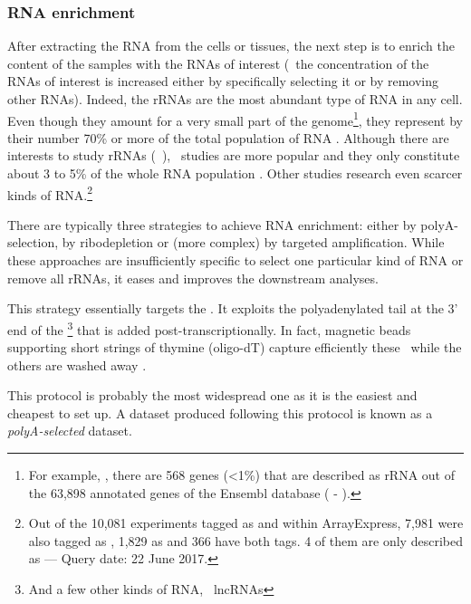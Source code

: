 \subsubsection{\gls{RNA} enrichment}

After extracting the \gls{RNA} from the cells or tissues,
the next step is to enrich the content of the samples with the \glspl{RNA}
of interest (\ie\ the concentration of the \glspl{RNA} of interest is increased
either by specifically selecting it or by removing other \glspl{RNA}). Indeed,
the \glspl{rRNA} are the most abundant type of \gls{RNA} in any cell. Even
though they amount for a very small part of the genome\footnote{For example,
, there are 568 genes (<1\%) that are described as
\gls{rRNA} out of the 63,898 annotated genes of the \gls{Ensembl} database
( - ).}, they represent by their number 70\% or more of
the total population of \gls{RNA} .
Although there are interests to study \glspl{rRNA} (\eg\ ),
\mRNAs\ studies are more
popular and they only constitute about 3 to 5\% of the whole \gls{RNA} population
. Other studies research even scarcer kinds of
\gls{RNA}.\footnote{Out of the 10,081 experiments tagged as  and  within \gls{ArrayExpress},
7,981 were also tagged as ,
1,829 as  and 366 have both tags.
4 of them are only described as  --- Query date: 22 June 2017.}

There are typically three strategies to achieve \gls{RNA} enrichment:
either by polyA-selection, by ribodepletion or (more complex)
by targeted amplification. While these
approaches are insufficiently specific to select one particular kind of \gls{RNA}
or remove all \glspl{rRNA}, it eases and improves the downstream analyses.

This strategy essentially targets the \mRNAs. It exploits the polyadenylated
tail at the 3' end of the \mRNAs\footnote{And a few other kinds of \gls{RNA},
\eg\ \glspl{lncRNA} } that is added
post-transcriptionally. In fact, magnetic beads supporting short
strings of thymine (oligo-dT) capture efficiently these \mRNAs\ while the others
are washed away .

This protocol is probably the most widespread one as it is the easiest and
cheapest to set up. A dataset produced following this protocol is known as
a \emph{polyA-selected} dataset.

